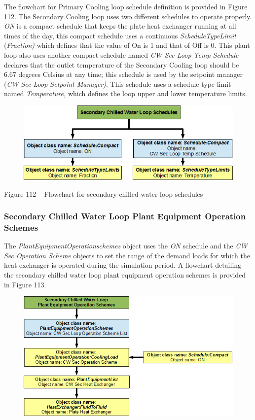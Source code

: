 The flowchart for Primary Cooling loop schedule definition is provided in Figure 112. The Secondary Cooling loop uses two different schedules to operate properly. \emph{ON} is a compact schedule that keeps the plate heat exchanger running at all times of the day, this compact schedule uses a continuous \emph{ScheduleTypeLimit} (\emph{Fraction)} which defines that the value of On is 1 and that of Off is 0. This plant loop also uses another compact schedule named \emph{CW Sec Loop Temp Schedule} declares that the outlet temperature of the Secondary Cooling loop should be 6.67 degrees Celsius at any time; this schedule is used by the setpoint manager (\emph{CW Sec Loop Setpoint Manager)}. This schedule uses a schedule type limit named \emph{Temperature,} which defines the loop upper and lower temperature limits.

\begin{figure}[htbp]
\centering
\includegraphics{media/image112.png}
\caption{}
\end{figure}

Figure 112 -- Flowchart for secondary chilled water loop schedules

\subsubsection{Secondary Chilled Water Loop Plant Equipment Operation Schemes}\label{secondary-chilled-water-loop-plant-equipment-operation-schemes}

The \emph{PlantEquipmentOperationschemes} object uses the \emph{ON} schedule and the \emph{CW Sec Operation Scheme} objects to set the range of the demand loads for which the heat exchanger is operated during the simulation period. A flowchart detailing the secondary chilled water loop plant equipment operation schemes is provided in Figure 113.

\begin{figure}[htbp]
\centering
\includegraphics{media/image113.png}
\caption{}
\end{figure}

